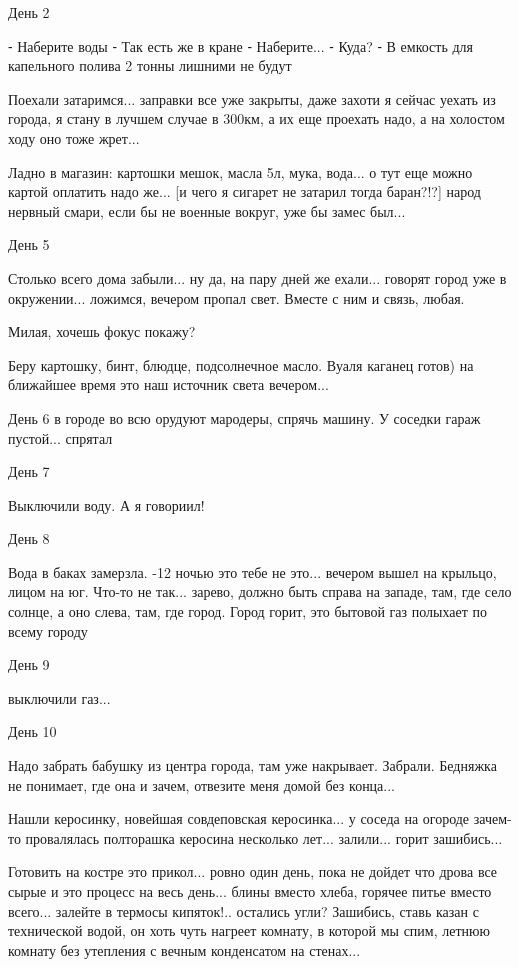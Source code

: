 День 2

⁃ Наберите воды
⁃ Так есть же в кране
⁃ Наберите...
⁃ Куда?
⁃ В емкость для капельного полива 2 тонны лишними не будут

Поехали затаримся... заправки все уже закрыты, даже захоти я сейчас уехать из
города, я стану в лучшем случае в 300км, а их еще проехать надо, а на холостом
ходу оно тоже жрет...

Ладно в магазин: картошки мешок, масла 5л, мука, вода... о тут еще можно картой
оплатить надо же... [и чего я сигарет не затарил тогда баран?!?] народ нервный
смари, если бы не военные вокруг, уже бы замес был...

День 5

Столько всего дома забыли... ну да, на пару дней же ехали... говорят город уже в
окружении... ложимся, вечером пропал свет. Вместе с ним и связь, любая. 

Милая, хочешь фокус покажу?

Беру картошку, бинт, блюдце, подсолнечное масло. Вуаля каганец готов) на ближайшее время это наш источник света вечером...

День 6 в городе во всю орудуют мародеры, спрячь машину. У соседки гараж пустой... спрятал

День 7

Выключили воду. А я говориил!

День 8

Вода в баках замерзла. -12 ночью это тебе не это... вечером вышел на крыльцо,
лицом на юг. Что-то не так... зарево, должно быть справа на западе, там, где село
солнце, а оно слева, там, где город. Город горит, это бытовой газ полыхает по
всему городу

День 9

выключили газ...

День 10

Надо забрать бабушку из центра города, там уже накрывает. Забрали. Бедняжка не
понимает, где она и зачем, отвезите меня домой без конца...

Нашли керосинку, новейшая совдеповская керосинка... у соседа на огороде зачем-то
провалялась полторашка керосина несколько лет... залили... горит зашибись...

Готовить на костре это прикол... ровно один день, пока не дойдет что дрова все
сырые и это процесс на весь день... блины вместо хлеба, горячее питье вместо
всего... залейте в термосы кипяток!.. остались угли? Зашибись, ставь казан с
технической водой, он хоть чуть нагреет комнату, в которой мы спим, летнюю
комнату без утепления с вечным конденсатом на стенах...

